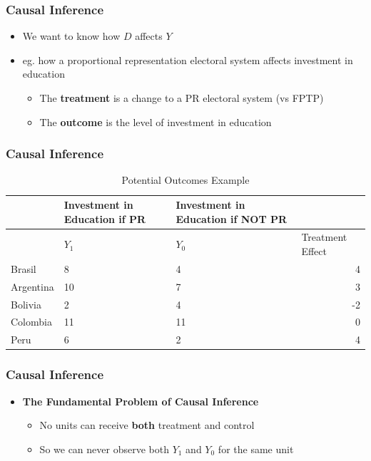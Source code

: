 \documentclass[xcolor=x11names,compress]{beamer}\usepackage[]{graphicx}\usepackage[]{color}
\renewcommand{\(}{\begin{columns}}
\renewcommand{\)}{\end{columns}}
\newcommand{\<}[1]{\begin{column}{#1}}
\renewcommand{\>}{\end{column}}
\begin{document}
\begin{frame}
\frametitle{Causal Inference}
\begin{itemize}
\item We want to know how $D$ affects $Y$
\pause
\item eg. how a proportional representation electoral system affects investment in education
\pause
\begin{itemize}
\item The \textbf{treatment} is a change to a PR electoral system (vs FPTP)
\pause
\item The \textbf{outcome} is the level of investment in education
\end{itemize}
\end{itemize}
\end{frame}


\begin{frame}
\frametitle{Causal Inference}
\begin{table}[htbp]
  \centering
  \caption{Potential Outcomes Example}
    \begin{tabular}{|l|p{2.4cm}|p{2.4cm}|r|}
    \hline
          & \multicolumn{1}{p{2.4cm}|}{Investment in Education if PR} & \multicolumn{1}{p{2.4cm}|}{Investment in Education if NOT PR} &  \bigstrut\\
    \hline
          & \multicolumn{1}{l|}{$Y_1$} & \multicolumn{1}{l|}{$Y_0$} & \multicolumn{1}{l|}{Treatment Effect} \bigstrut\\
    \hline
    Brasil & 8     & 4     & 4 \bigstrut\\
    \hline
    Argentina & 10    & 7     & 3 \bigstrut\\
    \hline
    Bolivia & 2     & 4     & -2 \bigstrut\\
    \hline
    Colombia & 11    & 11    & 0 \bigstrut\\
    \hline
    Peru & 6     & 2     & 4 \bigstrut\\
    \hline
    \end{tabular}%
  \label{tab:addlabel}%
\end{table}%
\end{frame}

\begin{frame}
\frametitle{Causal Inference}
\begin{itemize}
\item \textbf{The Fundamental Problem of Causal Inference}
\pause
\begin{itemize}
\item No units can receive \textbf{both} treatment and control
\pause
\item So we can never observe both $Y_1$ and $Y_0$ for the same unit
\end{itemize}
\end{itemize}
\end{frame}
\end{document}
